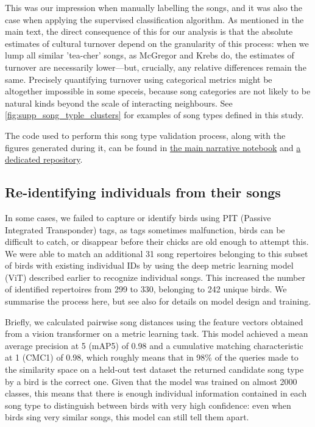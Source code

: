 \documentclass[9pt, onecolumn, twoside, lineno]{gsajnl}
\begin{document}
This was our impression when manually labelling the songs, and it was also the case when applying the supervised classification algorithm. As mentioned in the main text, the direct consequence of this for our analysis is that the absolute estimates of cultural turnover depend on the granularity of this process: when we lump all similar 'tea-cher' songs, as McGregor and Krebs \autocite{mcgregor1982b} do, the estimates of turnover are necessarily lower---but, crucially, any relative differences remain the same. Precisely quantifying turnover using categorical metrics might be altogether impossible in some speceis, because song categories are not likely to be natural kinds beyond the scale of interacting neighbours. See \autoref{fig:supp_song_typle_clusters} for examples of song types defined in this study.

The code used to perform this song type validation process, along with the figures generated during it, can be found in \href{https://github.com/nilomr/wytham-songtype-validation/blob/main/notebooks/4_train-model.ipynb}{the main narrative notebook} and \href{https://github.com/nilomr/wytham-songtype-validation}{a dedicated repository}.

\subsection{Re-identifying individuals from their songs}

In some cases, we failed to capture or identify birds using PIT (Passive Integrated Transponder) tags, as tags sometimes malfunction, birds can be difficult to catch, or disappear before their chicks are old enough to attempt this.  We were able to match an additional 31 song repertoires belonging to this subset of birds with existing individual IDs by using the deep metric learning model (ViT) described earlier to recognize individual songs. This increased the number of identified repertoires from 299 to 330, belonging to 242 unique birds. We summarise the process here, but see also \autocite{merinorecalde2023a} for details on model design and training.

Briefly, we calculated pairwise song distances using the feature vectors obtained from a vision transformer on a metric learning task. This model achieved a mean average precision at 5 (mAP\@5) of 0.98 and a cumulative matching characteristic at 1 (CMC\@1) of 0.98, which roughly means that in 98\% of the queries made to the similarity space on a held-out test dataset the returned candidate song type by a bird is the correct one. Given that the model was trained on almost 2000 classes, this means that there is enough individual information contained in each song type to distinguish between birds with very high confidence: even when birds sing very similar songs, this model can still tell them apart.
\end{document}
